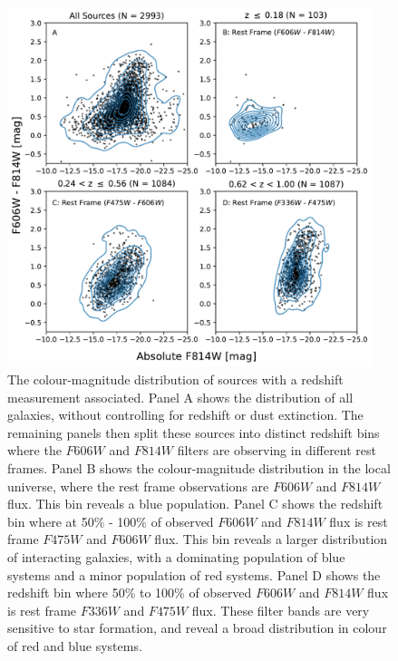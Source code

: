 {\begin{figure}
  \centering
  \includegraphics[width=0.95\textwidth]{Chapter2/figures/fig13.pdf}
  \caption[The colour-magnitude distribution of sources with a redshift measurement associated.]{The colour-magnitude distribution of sources with a redshift measurement associated. Panel A shows the distribution of all galaxies, without controlling for redshift or dust extinction. The remaining panels then split these sources into distinct redshift bins where the $F606W$ and $F814W$ filters are observing in different rest frames. Panel B shows the colour-magnitude distribution in the local universe, where the rest frame observations are $F606W$ and $F814W$ flux. This bin reveals a blue population. Panel C shows the redshift bin where at 50\% - 100\% of observed $F606W$ and $F814W$ flux is rest frame $F475W$ and $F606W$ flux. This bin reveals a larger distribution of interacting galaxies, with a dominating population of blue systems and a minor population of red systems. Panel D shows the redshift bin where 50\% to 100\% of observed $F606W$ and $F814W$ flux is rest frame $F336W$ and $F475W$ flux. These filter bands are very sensitive to star formation, and reveal a broad distribution in colour of red and blue systems.}
  \label{fig:colour-magnitude}
\end{figure}

}
